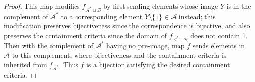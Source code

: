 \documentclass{article}
\begin{document}
\begin{proof}
    This map modifies $f_{\mathcal{A}^*\sqcup\mathcal{B}}$ by first sending
    elements whose image $Y$ is in the complement of $\mathcal{A}^*$ to a
    corresponding element $Y\setminus\{1\}\in\mathcal{A}$ instead; this
    modification preserves bijectiveness since the correspondence is
    bijective, and also preserves the containment criteria since the domain
    of $f_{\mathcal{A}^*\sqcup\mathcal{B}}$ does not contain 1. Then with
    the complement of $\mathcal{A}^*$ having no pre-image, map $f$ sends
    elements in $\mathcal{A}$ to this complement, where bijectiveness
    and the containment criteria is inherited from $f_{\mathcal{A}^*}$.
    Thus $f$ is a bijection satisfying the desired containment criteria. 
  \end{proof}
\end{document}
